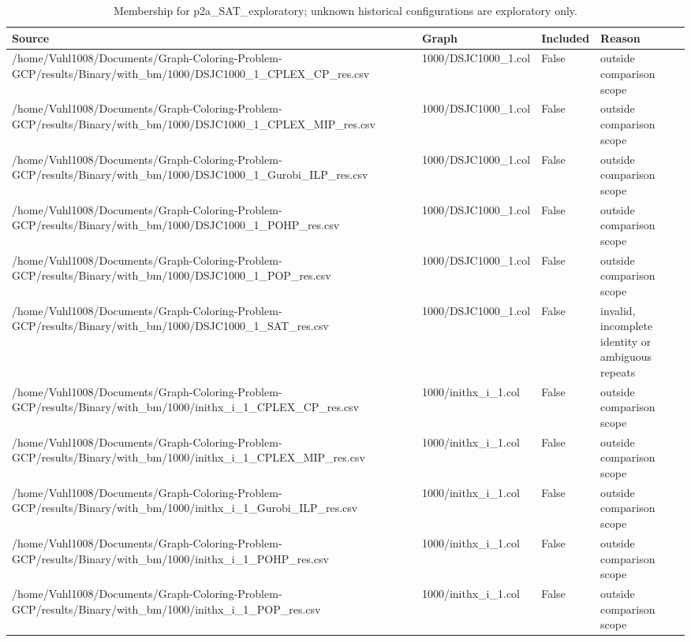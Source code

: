 \begin{table}[htbp]
\centering
\caption{Membership for p2a\_SAT\_exploratory; unknown historical configurations are exploratory only.}
\label{tab:p2a-SAT-exploratory-membership}
\begin{tabular}{llll}
\hline
Source & Graph & Included & Reason \\
\hline
/home/Vuhl1008/Documents/Graph-Coloring-Problem-GCP/results/Binary/with\_bm/1000/DSJC1000\_1\_CPLEX\_CP\_res.csv & 1000/DSJC1000\_1.col & False & outside comparison scope \\
/home/Vuhl1008/Documents/Graph-Coloring-Problem-GCP/results/Binary/with\_bm/1000/DSJC1000\_1\_CPLEX\_MIP\_res.csv & 1000/DSJC1000\_1.col & False & outside comparison scope \\
/home/Vuhl1008/Documents/Graph-Coloring-Problem-GCP/results/Binary/with\_bm/1000/DSJC1000\_1\_Gurobi\_ILP\_res.csv & 1000/DSJC1000\_1.col & False & outside comparison scope \\
/home/Vuhl1008/Documents/Graph-Coloring-Problem-GCP/results/Binary/with\_bm/1000/DSJC1000\_1\_POHP\_res.csv & 1000/DSJC1000\_1.col & False & outside comparison scope \\
/home/Vuhl1008/Documents/Graph-Coloring-Problem-GCP/results/Binary/with\_bm/1000/DSJC1000\_1\_POP\_res.csv & 1000/DSJC1000\_1.col & False & outside comparison scope \\
/home/Vuhl1008/Documents/Graph-Coloring-Problem-GCP/results/Binary/with\_bm/1000/DSJC1000\_1\_SAT\_res.csv & 1000/DSJC1000\_1.col & False & invalid, incomplete identity or ambiguous repeats \\
/home/Vuhl1008/Documents/Graph-Coloring-Problem-GCP/results/Binary/with\_bm/1000/inithx\_i\_1\_CPLEX\_CP\_res.csv & 1000/inithx\_i\_1.col & False & outside comparison scope \\
/home/Vuhl1008/Documents/Graph-Coloring-Problem-GCP/results/Binary/with\_bm/1000/inithx\_i\_1\_CPLEX\_MIP\_res.csv & 1000/inithx\_i\_1.col & False & outside comparison scope \\
/home/Vuhl1008/Documents/Graph-Coloring-Problem-GCP/results/Binary/with\_bm/1000/inithx\_i\_1\_Gurobi\_ILP\_res.csv & 1000/inithx\_i\_1.col & False & outside comparison scope \\
/home/Vuhl1008/Documents/Graph-Coloring-Problem-GCP/results/Binary/with\_bm/1000/inithx\_i\_1\_POHP\_res.csv & 1000/inithx\_i\_1.col & False & outside comparison scope \\
/home/Vuhl1008/Documents/Graph-Coloring-Problem-GCP/results/Binary/with\_bm/1000/inithx\_i\_1\_POP\_res.csv & 1000/inithx\_i\_1.col & False & outside comparison scope \\

\end{tabular}
\end{table}
